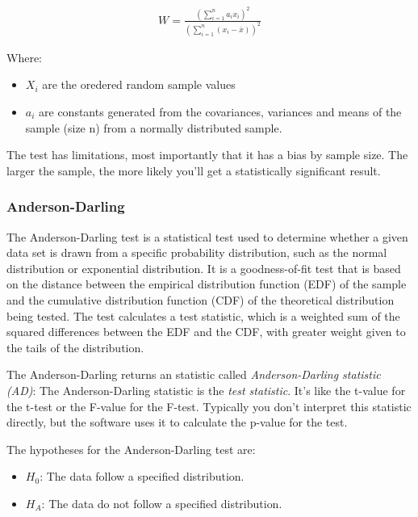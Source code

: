 \documentclass[11pt]{article}
\begin{document}
\begin{gather}
  W=\frac{(\sum_{i=1}^n a_i x_i)^2}{(\sum_{i=1}^n (x_i - \overline{x}))^2}
\end{gather}

Where: 
\begin{itemize}
  \item \(X_i\) are the oredered random sample values
  \item \(a_i\) are constants generated from the covariances, variances and means of the
  sample (size n) from a normally distributed sample.
\end{itemize}

The test has limitations, most importantly that it has a bias by sample
size. The larger the sample, the more likely you'll get a statistically
significant result.

\hypertarget{anderson-darling}{%
\subsubsection{Anderson-Darling}\label{anderson-darling}}

The Anderson-Darling test is a statistical test used to determine
whether a given data set is drawn from a specific probability
distribution, such as the normal distribution or exponential
distribution. It is a goodness-of-fit test that is based on the distance
between the empirical distribution function (EDF) of the sample and the
cumulative distribution function (CDF) of the theoretical distribution
being tested. The test calculates a test statistic, which is a weighted
sum of the squared differences between the EDF and the CDF, with greater
weight given to the tails of the distribution.

The Anderson-Darling returns an statistic called \emph{Anderson-Darling
statistic (AD)}: The Anderson-Darling statistic is the \emph{test
statistic}. It's like the t-value for the t-test or the F-value for the
F-test. Typically you don't interpret this statistic directly, but the
software uses it to calculate the p-value for the test.

The hypotheses for the Anderson-Darling test are:
\begin{itemize}
  \item \(H_0\): The data follow a specified distribution.
  \item \(H_A\): The data do not follow a specified distribution.
\end{itemize}
\end{document}
